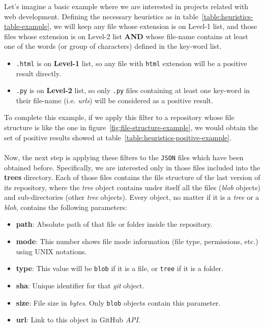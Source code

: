 \documentclass[a4paper, 12pt]{book}
\begin{document}
Let's imagine a basic example where we are interested in projects related with web development. Defining the
necessary heuristics as in table~\ref{table:heuristics-table-example}, we will keep any file whose extension
is on Level-1 list, and those files whose extension is on Level-2 list \textbf{AND} whose file-name contains at least one
of the words (or group of characters) defined in the key-word list.\\
\begin{itemize}
  \item \texttt{.html} is on \textbf{Level-1} list, so any file with \texttt{html} extension will be a positive result directly.
  \item \texttt{.py} is on \textbf{Level-2} list, so only \texttt{.py} files containing at least one key-word in their file-name
  (i.e. \textit{urls}) will be considered as a positive result.
\end{itemize}
To complete this example, if we apply this filter to a repository whose file structure is like the one in figure~\ref{fig:file-structure-example},
we would obtain the set of positive results showed at table~\ref{table:heuristics-positive-example}.\\\\
Now, the next step is applying these filters to the \texttt{JSON} files which have been obtained before.
Specifically, we are interested only in those files included into the \textbf{trees} directory.
Each of those files contains the file structure of the last version of its repository,
where the \textit{tree} object contains under itself all the files (\textit{blob} objects) and sub-directories
(other \textit{tree} objects). Every object, no matter if it is a \textit{tree} or a \textit{blob}, contains the following parameters:
\begin{itemize}
  \item \textbf{path}: Absolute path of that file or folder inside the repository.
  \item \textbf{mode}: This number shows file mode information (file type, permissions, etc.) using UNIX notations.
  \item \textbf{type}: This value will be \texttt{blob} if it is a file, or \texttt{tree} if it is a folder.
  \item \textbf{sha}: Unique identifier for that \emph{git} object.
  \item \textbf{size}: File size in \textit{bytes}. Only \texttt{blob} objects contain this parameter.
  \item \textbf{url}: Link to this object in GitHub \textit{API}.
\end{itemize}
\end{document}
